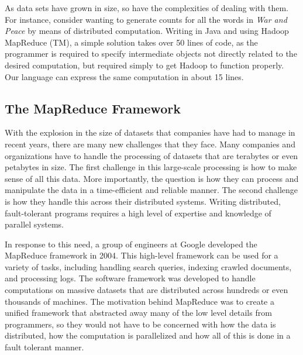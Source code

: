 \documentclass{report}
\begin{document}
As data sets have grown in size, so have the complexities of dealing with them.
For instance, consider wanting to generate counts for all the words in \emph{War
and Peace} by means of distributed computation. Writing in Java and using Hadoop
MapReduce (TM), a simple solution takes over 50 lines of code, as the programmer
is required to specify intermediate objects not directly related to the desired
computation, but required simply to get Hadoop to function properly. Our language 
can express the same computation in about 15 lines.

\subsection{The MapReduce Framework}
\label{sub:mapreduce}

With the explosion in the size of datasets that companies have had to manage in
recent years, there are many new challenges that they face. Many companies and
organizations have to handle the processing of datasets that are terabytes or even
petabytes in size. The first challenge in this large-scale processing is how to
make sense of all this data. More importantly, the question is how they can 
process and manipulate the data in a time-efficient and reliable manner. 
The second challenge is how they handle this across their distributed systems. Writing distributed, fault-tolerant programs requires a high level of expertise and knowledge of parallel systems.

In response to this need, a group of engineers at Google developed the MapReduce
framework in 2004. This high-level framework can be used for a variety of
tasks, including handling search queries, indexing crawled documents, and
processing logs. The software framework was developed to handle computations on
massive datasets that are distributed across hundreds or even thousands of
machines. The motivation behind MapReduce was to create a unified framework that
abstracted away many of the low level details from programmers, so they would not
have to be concerned with how the data is distributed, how the computation is
parallelized and how all of this is done in a fault tolerant manner.
\end{document}
